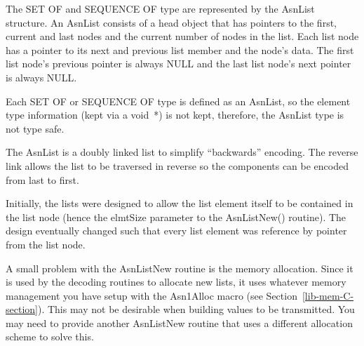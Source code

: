 The SET OF and SEQUENCE OF type are represented by the {\C AsnList}
structure.  An {\C AsnList} consists of a head object that has
pointers to the first, current and last nodes and the current number
of nodes in the list.  Each list node has a pointer to its next and
previous list member and the node's data.  The first list node's
previous pointer is always NULL and the last list node's next pointer
is always NULL\@.

Each SET OF or SEQUENCE OF type is defined as an {\C AsnList}, so the
element type information (kept via a {\C void~*}) is not kept,
therefore, the {\C AsnList} type is not type safe.

The {\C AsnList} is a doubly linked list to simplify ``backwards''
encoding.  The reverse link allows the list to be traversed in reverse
so the components can be encoded from last to first.

Initially, the lists were designed to allow the list element itself to
be contained in the list node (hence the {\C elmtSize} parameter to
the AsnListNew() routine).  The design eventually changed such that
every list element was reference by pointer from the list node.

A small problem with the {\C AsnListNew} routine is the memory
allocation.  Since it is used by the decoding routines to allocate new
lists, it uses whatever memory management you have setup with the
{\C Asn1Alloc} macro (see Section~\ref{lib-mem-C-section}).  This may not be
desirable when building values to be transmitted.  You may need to
provide another AsnListNew routine that uses a different allocation
scheme to solve this.

